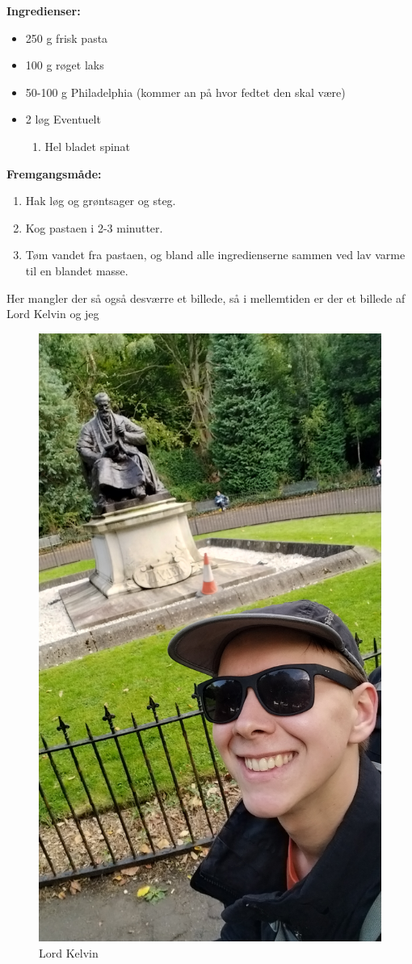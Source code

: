 \documentclass{book}
\begin{document}
\begin{minipage}[t] {0.5\textwidth}
\textbf{Ingredienser:}
    \begin{itemize}
        \item 250 g frisk pasta
        \item 100 g røget laks
        \item 50-100 g Philadelphia (kommer an på hvor fedtet den skal være)
        \item 2 løg
        Eventuelt
        \begin{enumerate}
            \item Hel bladet spinat
            
        \end{enumerate}
    \end{itemize}
\end{minipage}
\begin{minipage}[t] {0.5\textwidth}
 \textbf{Fremgangsmåde:}
 \begin{enumerate}
     \item Hak løg og grøntsager og steg.
     \item Kog pastaen i 2-3 minutter.
     \item Tøm vandet fra pastaen, og bland alle ingredienserne sammen ved lav varme til en blandet masse.
     
 \end{enumerate}
\end{minipage}
\newpage Her mangler der så også desværre et billede, så i mellemtiden er der et billede af Lord Kelvin og jeg
\begin{figure}
    \centering
    \includegraphics[width=0.5\linewidth]{Kelvin.jpg}
    \caption{Lord Kelvin }
\end{figure}
\end{document}
